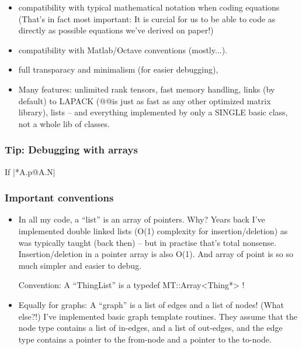 \begin{itemize}
\item compatibility with typical mathematical notation when coding
equations (That's in fact most important: It is curcial for us to be
able to code as directly as possible equations we've derived on
paper!)

\item compatibility with Matlab/Octave conventions (mostly...).

\item full transparacy and minimalism (for easier debugging),

\item Many features: unlimited rank tensors, fast memory handling, links
(by default) to LAPACK (@@is just as fast as any other
optimized matrix library), lists -- and everything implemented by only
a SINGLE basic class, not a whole lib of classes.
\end{itemize}

\subsubsection{Tip: Debugging with arrays}

If |*A.p@A.N|


\subsubsection{Important conventions}

\begin{itemize}
\item In all my code, a ``list'' is an array of pointers. Why? Years back
   I've implemented double linked lists (O(1) complexity for
   insertion/deletion) as was typically taught (back then) -- but in
   practise that's total nonsense. Insertion/deletion in a pointer
   array is also O(1). And array of point is so so much simpler and
   easier to debug.

   Convention: A ``ThingList'' is a typedef MT::Array<Thing*> !

\item Equally for graphs: A ``graph'' is a list of edges and a list of
   nodes! (What else?!) I've implemented basic graph template
   routines. They assume that the node type contains a list of
   in-edges, and a list of out-edges, and the edge type contains a
   pointer to the from-node and a pointer to the to-node.
\end{itemize}

